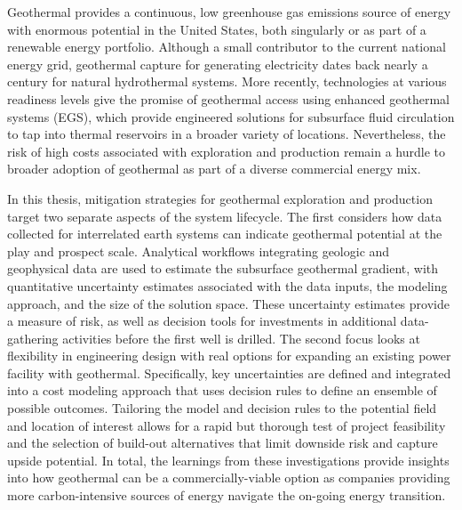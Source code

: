 % 
% 
%
Geothermal provides a continuous, low greenhouse gas emissions source of energy with enormous potential in the United States, both singularly or as part of a renewable energy portfolio. Although a small contributor to the current national energy grid, geothermal capture for generating electricity dates back nearly a century for natural hydrothermal systems. More recently, technologies at various readiness levels give the promise of geothermal access using enhanced geothermal systems (EGS), which provide engineered solutions for subsurface fluid circulation to tap into thermal reservoirs in a broader variety of locations. Nevertheless, the risk of high costs associated with exploration and production remain a hurdle to broader adoption of geothermal as part of a diverse commercial energy mix.

In this thesis, mitigation strategies for geothermal exploration and production target two separate aspects of the system lifecycle. The first considers how data collected for interrelated earth systems can indicate geothermal potential at the play and prospect scale. Analytical workflows integrating geologic and geophysical data are used to estimate the subsurface geothermal gradient, with quantitative uncertainty estimates associated with the data inputs, the modeling approach, and the size of the solution space. These uncertainty estimates provide a measure of risk, as well as decision tools for investments in additional data-gathering activities before the first well is drilled. The second focus looks at flexibility in engineering design with real options for expanding an existing power facility with geothermal. Specifically, key uncertainties are defined and integrated into a cost modeling approach that uses decision rules to define an ensemble of possible outcomes. Tailoring the model and decision rules to the potential field and location of interest allows for a rapid but thorough test of project feasibility and the selection of build-out alternatives that limit downside risk and capture upside potential. In total, the learnings from these investigations provide insights into how geothermal can be a commercially-viable option as companies providing more carbon-intensive sources of energy navigate the on-going energy transition.